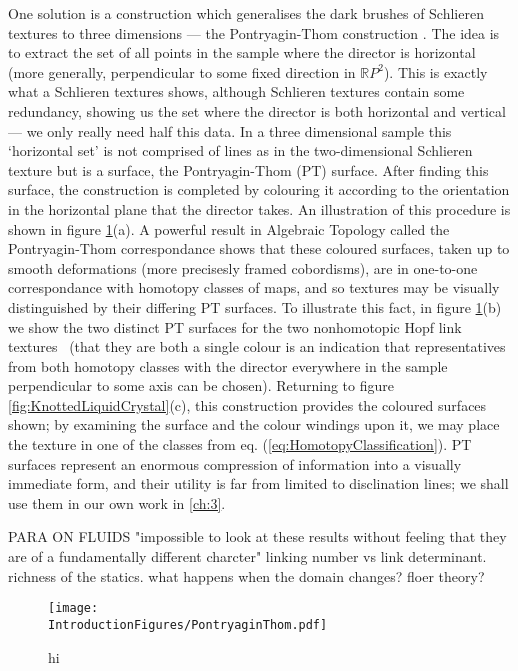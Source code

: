 One solution is a construction which generalises the dark brushes of Schlieren textures to three dimensions --- the Pontryagin-Thom construction \cite{ChenThesis, GarethBook,Machon, HopfFibrationExper}. The idea is to extract the set of all points in the sample where the director is horizontal (more generally, perpendicular to some fixed direction in $\mathbb{R}P^2$).  This is exactly what a Schlieren textures shows, although Schlieren textures contain some redundancy, showing us the set where the director is both horizontal and vertical ---  we only really need half this data. In a three dimensional sample this `horizontal set' is not comprised of lines as in the two-dimensional Schlieren texture but is a surface, the Pontryagin-Thom (PT) surface. After finding this surface, the construction is completed by colouring it according to the orientation in the horizontal plane that the director takes. An illustration of this procedure is shown in figure \ref{fig:PT}(a). A powerful result in Algebraic Topology called the Pontryagin-Thom correspondance \cite{Milnor, Hatcher} shows that these coloured surfaces, taken up to smooth deformations (more precisesly framed cobordisms), are in one-to-one correspondance with homotopy classes of maps, and so textures may be visually distinguished by their differing PT surfaces. To illustrate this fact, in figure \ref{fig:PT}(b) we show the two distinct  PT surfaces for the two nonhomotopic Hopf link textures~\cite{Machon} (that they are both a single colour is an indication that representatives from both homotopy classes with the director everywhere in the sample perpendicular to some axis can be chosen). Returning to figure \ref{fig:KnottedLiquidCrystal}(c), this construction provides the coloured surfaces shown; by examining the surface and the colour windings upon it, we may place the texture in one of the classes from eq. (\ref{eq:HomotopyClassification}). PT surfaces represent an enormous compression of information into a visually immediate form, and their utility is far from limited to disclination lines; we shall use them in our own work in \ref{ch:3}.

 PARA ON FLUIDS
 "impossible to look at these results without feeling that they are of a fundamentally different charcter"
 linking number vs link determinant.
 richness of the statics.
 what happens when the domain changes?
 floer theory?
\begin{figure}[htbp]
\centering
\texttt{[image: \\IntroductionFigures/PontryaginThom.pdf]}
\caption{hi }
\label{fig:PT}
\end{figure}
